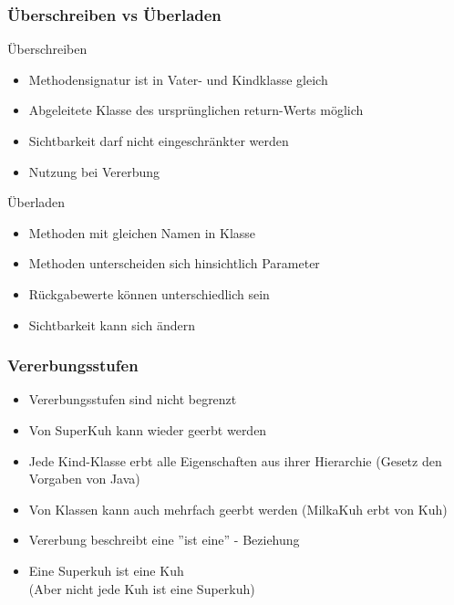 \begin{frame}[fragile]
	\frametitle{\"Uberschreiben vs \"Uberladen}
		\begin{exampleblock}{\"Uberschreiben}
			\begin{itemize}
			  \item Methodensignatur ist in Vater- und Kindklasse
			  gleich
			  \item Abgeleitete Klasse des urspr\"unglichen
			  return-Werts m\"oglich
			  \item Sichtbarkeit darf nicht eingeschr\"ankter werden
			  \item Nutzung bei Vererbung
			\end{itemize}
		\end{exampleblock}
		
		\begin{alertblock}{\"Uberladen}
			\begin{itemize}
			  \item Methoden mit gleichen Namen in Klasse
			  \item Methoden unterscheiden sich hinsichtlich
			  Parameter
			  \item R\"uckgabewerte k\"onnen unterschiedlich sein
			  \item Sichtbarkeit kann sich \"andern
			\end{itemize}
		\end{alertblock}  
\end{frame}

\begin{frame}[fragile]
	\frametitle{Vererbungsstufen}
			\begin{itemize}
			  \item Vererbungsstufen sind nicht
			  begrenzt
			  \item Von SuperKuh kann wieder geerbt 
			  werden
			  \item Jede Kind-Klasse erbt alle
			  Eigenschaften aus ihrer Hierarchie
			  (Gesetz den Vorgaben von Java)
			  \item Von Klassen kann auch mehrfach 
			  geerbt werden (MilkaKuh erbt von Kuh)
			  \item Vererbung beschreibt eine ''ist eine''
			  - Beziehung
			  \item Eine Superkuh ist eine Kuh\\
			 (Aber nicht jede Kuh ist eine Superkuh)
		\end{itemize}
\end{frame} 

